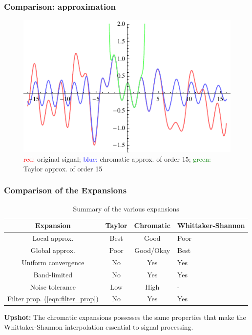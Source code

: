 \documentclass{beamer}
\begin{document}

\begin{frame}
\frametitle{Comparison: approximation}

\begin{figure} %
\centering
	\includegraphics[width=0.8\columnwidth]{../figures/approx}
\caption{\textcolor{red}{red:} original signal; 
\textcolor{blue}{blue:} chromatic approx. of order 15;
\textcolor{green}{green:} Taylor approx. of order 15}
\end{figure}

\end{frame}


\begin{frame}
\frametitle{Comparison of the Expansions}

\begin{table}
\begin{tabular}{c c c p{2cm}}
\toprule
\textbf{Expansion} & Taylor & Chromatic & Whittaker-Shannon\\
\midrule
Local approx. & Best & Good & Poor \\
Global approx. & Poor & Good/Okay & Best \\
Uniform convergence & No & Yes & Yes \\
Band-limited & No & Yes & Yes \\
Noise tolerance & Low & High & - \\
Filter prop. (\ref{eqn:filter_prop}) & No & Yes & Yes \\
\bottomrule
\end{tabular}
\caption{Summary of the various expansions}
\end{table}

\textbf{Upshot:} The chromatic expansions possesses the same properties 
that make the Whittaker-Shannon interpolation essential to signal processing.


\end{frame}
\end{document}
